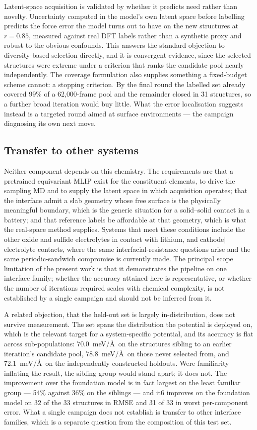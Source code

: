 \documentclass[11pt]{article}
\begin{document}
Latent-space acquisition is validated by whether it predicts need rather than
novelty. Uncertainty computed in the model's own latent space before labelling
predicts the force error the model turns out to have on the new structures at
$r=0.85$, measured against real DFT labels rather than a synthetic proxy and
robust to the obvious confounds. This answers the standard objection to
diversity-based selection directly, and it is convergent evidence, since the
selected structures were extreme under a criterion that ranks the candidate
pool nearly independently. The coverage formulation also supplies something a
fixed-budget scheme cannot: a stopping criterion. By the final round the
labelled set already covered 99\% of a 62{,}000-frame pool and the remainder
closed in 31 structures, so a further broad iteration would buy little. What
the error localisation suggests instead is a targeted round aimed at surface
environments --- the campaign diagnosing its own next move.

\subsection*{Transfer to other systems}
\label{sec:general}

Neither component depends on this chemistry. The requirements are that a
pretrained equivariant MLIP exist for the constituent elements, to drive the
sampling MD and to supply the latent space in which acquisition operates; that
the interface admit a slab geometry whose free surface is the physically
meaningful boundary, which is the generic situation for a solid--solid contact
in a battery; and that reference labels be affordable at that geometry, which
is what the real-space method supplies. Systems that meet these conditions
include the other oxide and sulfide electrolytes in contact with lithium, and
cathode$|$electrolyte contacts, where the same interfacial-resistance questions
arise and the same periodic-sandwich compromise is currently made. The
principal scope limitation of the present work is that it demonstrates the
pipeline on one interface family; whether the accuracy attained here is
representative, or whether the number of iterations required scales with
chemical complexity, is not established by a single campaign and should not be
inferred from it.

A related objection, that the held-out set is largely in-distribution, does not
survive measurement. The set spans the distribution the potential is deployed
on, which is the relevant target for a system-specific potential, and its
accuracy is flat across sub-populations: 70.0~meV/\AA\ on the structures
sibling to an earlier iteration's candidate pool, 78.8~meV/\AA\ on those never
selected from, and 72.1~meV/\AA\ on the independently constructed holdouts. Were
familiarity inflating the result, the sibling group would stand apart; it does
not. The improvement over the foundation model is in fact largest on the least
familiar group --- 54\% against 36\% on the siblings --- and it6 improves on the
foundation model on 32 of the 33 structures in RMSE and 31 of 33 in worst
per-component error. What a single campaign does not establish is transfer to
other interface families, which is a separate question from the composition of
this test set.
\end{document}
